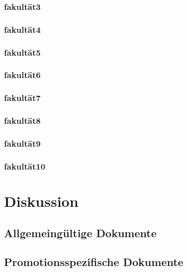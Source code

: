 \subsubsection{\gls{fakultät3}}
\subsubsection{\gls{fakultät4}}
\subsubsection{\gls{fakultät5}}
\subsubsection{\gls{fakultät6}}
\subsubsection{\gls{fakultät7}}
\subsubsection{\gls{fakultät8}}
\subsubsection{\gls{fakultät9}}
\subsubsection{\gls{fakultät10}}

\section{Diskussion}\label{sec:luh-repo-discussion}
\subsection{Allgemeingültige Dokumente}\label{sec:luh-repo-discussion-general}
\subsection{Promotionsspezifische Dokumente}\label{sec:luh-repo-discussion-specific}

